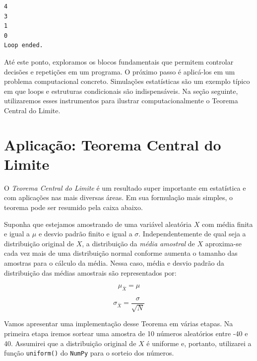 \documentclass[
  brazilian,
  letterpaper,
  DIV=11,
  numbers=noendperiod]{scrreprt}
\begin{document}
\begin{verbatim}
4
3
1
0
Loop ended.
\end{verbatim}

Até este ponto, exploramos os blocos fundamentais que permitem controlar
decisões e repetições em um programa. O próximo passo é aplicá-los em um
problema computacional concreto. Simulações estatísticas são um exemplo
típico em que loops e estruturas condicionais são indispensáveis. Na
seção seguinte, utilizaremos esses instrumentos para ilustrar
computacionalmente o Teorema Central do Limite.

\section{Aplicação: Teorema Central do
Limite}\label{aplicauxe7uxe3o-teorema-central-do-limite}

O \emph{Teorema Central do Limite} é um resultado super importante em
estatística e com aplicações nas mais diversas áreas. Em sua formulação
mais simples, o teorema pode ser resumido pela caixa abaixo.

\begin{tcolorbox}[enhanced jigsaw, breakable, coltitle=black, title=\textcolor{quarto-callout-tip-color}{\faLightbulb}\hspace{0.5em}{Teorema Central do Limite}, titlerule=0mm, colbacktitle=quarto-callout-tip-color!10!white, opacitybacktitle=0.6, arc=.35mm, bottomrule=.15mm, toptitle=1mm, opacityback=0, colback=white, bottomtitle=1mm, toprule=.15mm, rightrule=.15mm, left=2mm, colframe=quarto-callout-tip-color-frame, leftrule=.75mm]

Suponha que estejamos amostrando de uma variável aleatória \(X\) com
média finita e igual a \(\mu\) e desvio padrão finito e igual a
\(\sigma\). Independentemente de qual seja a distribuição original de
\(X\), a distribuição da \emph{média amostral} de \(X\) aproxima-se cada
vez mais de uma distribuição normal conforme aumenta o tamanho das
amostras para o cálculo da média. Nessa caso, média e desvio padrão da
distribuição das médias amostrais são representados por:

\[\mu_{\bar{X}}=\mu\]

\[\sigma_{\bar{X}}=\frac{\sigma}{\sqrt{N}}\]

\end{tcolorbox}

Vamos apresentar uma implementação desse Teorema em várias etapas. Na
primeira etapa iremos sortear uma amostra de 10 números aleatórios entre
-40 e 40. Assumirei que a distribuição original de \(X\) é uniforme e,
portanto, utilizarei a função \texttt{uniform()} do \texttt{NumPy} para
o sorteio dos números.
\end{document}
